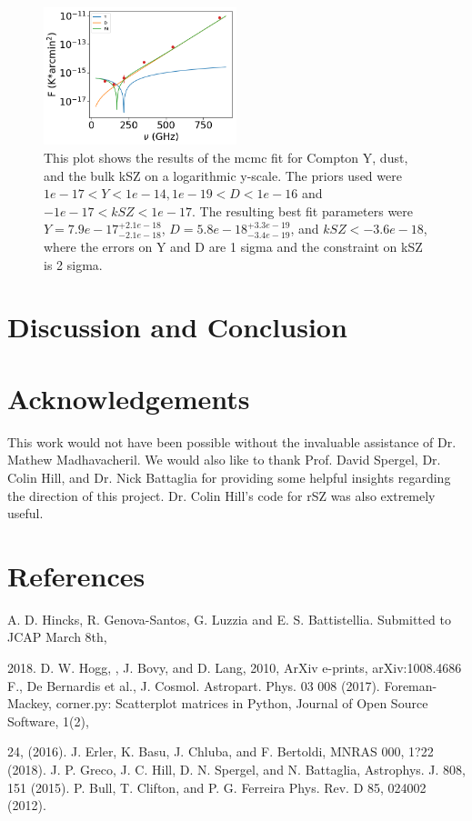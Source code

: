 \documentclass{princeton_astro_thesis}
\begin{document}
\begin{figure}[h]
\centering
\includegraphics[width=0.5\textwidth]{../redmapper_apfluxes_kSZfitlog.png}
\caption{This plot shows  the results of the mcmc fit for Compton Y, dust, and the bulk kSZ on a logarithmic y-scale. The priors used were $ 1e-17 < Y < 1e-14, 1e-19< D < 1e-16$ and $-1e-17 < kSZ <1e-17.$ The resulting best fit parameters were $Y=7.9e-17^{+2.1e-18}_{-2.1e-18}$, $D=5.8e-18^{+3.3e-19}_{-3.4e-19}$, and $kSZ<-3.6e-18$, where the errors on Y and D are 1 sigma and the constraint on kSZ is 2 sigma.} %
\end{figure}


\chapter{Discussion and Conclusion}



\chapter{Acknowledgements}
This work would not have been possible without the invaluable assistance of Dr. Mathew Madhavacheril. We would also like to thank Prof. David Spergel,  Dr. Colin Hill, and Dr. Nick Battaglia for providing some helpful insights regarding the direction of this project.   Dr. Colin Hill's code for rSZ was also extremely useful. 

\chapter{References}
A. D. Hincks, R. Genova-Santos, G. Luzzia and E. S. Battistellia. Submitted to JCAP March 8th, \par 2018. \newline
D. W. Hogg, , J. Bovy,  and D. Lang,  2010, ArXiv e-prints, arXiv:1008.4686 \newline
F., De Bernardis et al., J. Cosmol. Astropart. Phys. 03 008 (2017). \newline
Foreman-Mackey, corner.py: Scatterplot matrices in Python, Journal of Open Source Software, 1(2), \par 24, (2016).\newline
J. Erler, K. Basu, J. Chluba, and F. Bertoldi, MNRAS 000, 1?22 (2018).
J. P. Greco, J. C. Hill, D. N. Spergel, and N. Battaglia,
Astrophys. J. 808, 151 (2015). \newline
P. Bull, T. Clifton, and P. G. Ferreira Phys. Rev. D 85, 024002 (2012). \newline
\end{document}
